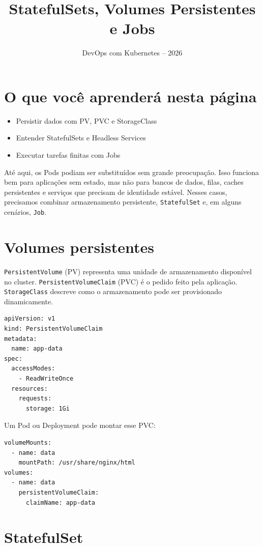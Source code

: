 \documentclass[11pt,a4paper]{article}
\title{\color{secondary}\Huge\textbf{StatefulSets, Volumes Persistentes e Jobs}}
\author{\color{primary}DevOps com Kubernetes -- 2026}
\date{}
\begin{document}
\maketitle


\section*{\color{primary}O que você aprenderá nesta página}
\begin{itemize}
\item Persistir dados com PV, PVC e StorageClass
\item Entender StatefulSets e Headless Services
\item Executar tarefas finitas com Jobs
\end{itemize}

Até aqui, os Pods podiam ser substituídos sem grande preocupação. Isso funciona bem para aplicações sem estado, mas não para bancos de dados, filas, caches persistentes e serviços que precisam de identidade estável. Nesses casos, precisamos combinar armazenamento persistente, \texttt{StatefulSet} e, em alguns cenários, \texttt{Job}.

\section*{\color{primary}Volumes persistentes}

\texttt{PersistentVolume} (PV) representa uma unidade de armazenamento disponível no cluster. \texttt{PersistentVolumeClaim} (PVC) é o pedido feito pela aplicação. \texttt{StorageClass} descreve como o armazenamento pode ser provisionado dinamicamente.

\begin{lstlisting}[language=bash]
apiVersion: v1
kind: PersistentVolumeClaim
metadata:
  name: app-data
spec:
  accessModes:
    - ReadWriteOnce
  resources:
    requests:
      storage: 1Gi
\end{lstlisting}

Um Pod ou Deployment pode montar esse PVC:

\begin{lstlisting}[language=bash]
volumeMounts:
  - name: data
    mountPath: /usr/share/nginx/html
volumes:
  - name: data
    persistentVolumeClaim:
      claimName: app-data
\end{lstlisting}

\section*{\color{primary}StatefulSet}
\end{document}
